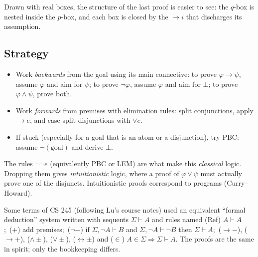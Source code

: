 Drawn with real boxes, the structure of the last proof is easier to see: the $q$-box is
nested inside the $p$-box, and each box is closed by the $\to i$ that discharges its
assumption.
\begin{center}
\end{center}

\subsection{Strategy}
\begin{itemize}
  \item Work \emph{backwards} from the goal using its main connective: to prove
        $\varphi\to\psi$, assume $\varphi$ and aim for $\psi$; to prove $\neg\varphi$,
        assume $\varphi$ and aim for $\bot$; to prove $\varphi\land\psi$, prove both.
  \item Work \emph{forwards} from premises with elimination rules: split conjunctions,
        apply $\to e$, and case-split disjunctions with $\lor e$.
  \item If stuck (especially for a goal that is an atom or a disjunction), try PBC:
        assume $\neg(\text{goal})$ and derive $\bot$.
\end{itemize}

\begin{aside}
The rules $\neg\neg e$ (equivalently PBC or LEM) are what make this \emph{classical}
logic. Dropping them gives \emph{intuitionistic} logic, where a proof of $\varphi\lor\psi$
must actually prove one of the disjuncts. Intuitionistic proofs correspond to programs
(Curry--Howard).
\end{aside}

\begin{aside}
Some terms of CS 245 (following Lu's course notes) used an equivalent ``formal deduction''
system written with sequents $\Sigma\vdash A$ and rules named
(Ref) $A\vdash A$;\ (+) add premises;\ ($\neg-$) if $\Sigma,\neg A\vdash B$ and
$\Sigma,\neg A\vdash\neg B$ then $\Sigma\vdash A$;\ ($\to-$), ($\to+$), ($\land\pm$),
($\lor\pm$), ($\leftrightarrow\pm$) and ($\in$) $A\in\Sigma\Rightarrow\Sigma\vdash A$.
The proofs are the same in spirit; only the bookkeeping differs.
\end{aside}

